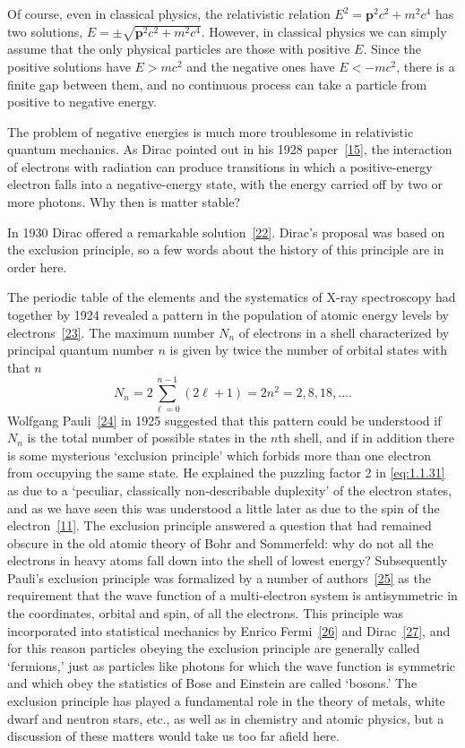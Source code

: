 Of course, even in classical physics, the relativistic relation
$E^2=\mathbf{p}^2c^2+m^2c^4$ has two solutions, $E=\pm\sqrt{\mathbf{p}^2c^2+m^2c^4}$. However,
in classical physics we can simply assume that the only physical particles
are those with positive $E$. Since the positive solutions have $E>mc^2$ and
the negative ones have $E<-mc^2$, there is a finite gap between them,
and no continuous process can take a particle from positive to negative
energy.

The problem of negative energies is much more troublesome in relativistic
quantum mechanics. As Dirac pointed out in his 1928 paper~\hyperref[ref:1.15]{[15]}, the
interaction of electrons with radiation can produce transitions in which a
positive-energy electron falls into a negative-energy state, with the energy
carried off by two or more photons. Why then is matter stable?

In 1930 Dirac offered a remarkable solution~\hyperref[ref:1.22]{[22]}. Dirac's proposal was
based on the exclusion principle, so a few words about the history of this
principle are in order here.

The periodic table of the elements and the systematics of X-ray spectroscopy
had together by 1924 revealed a pattern in the population of
atomic energy levels by electrons~\hyperref[ref:1.23]{[23]}. The maximum number $N_n$ of electrons
in a shell characterized by principal quantum number $n$ is given by twice
the number of orbital states with that $n$
\begin{equation}
  N_n=2\sum_{\ell=0}^{n-1}(2\ell+1)=2n^2=2,8,18,\ldots.
  \tag{1.1.31}\label{eq:1.1.31}
\end{equation}
Wolfgang Pauli~\hyperref[ref:1.24]{[24]} in 1925 suggested that this pattern could be understood if
$N_n$ is the total number of possible states in the $n$th shell, and if in addition
there is some mysterious `exclusion principle' which forbids more than one
electron from occupying the same state. He explained the puzzling factor
2 in \eqref{eq:1.1.31} as due to a `peculiar, classically non-describable duplexity' of
the electron states, and as we have seen this was understood a little later
as due to the spin of the electron~\hyperref[ref:1.11]{[11]}. The exclusion principle answered a
question that had remained obscure in the old atomic theory of Bohr and
Sommerfeld: why do not all the electrons in heavy atoms fall down into
the shell of lowest energy? Subsequently Pauli's exclusion principle was
formalized by a number of authors~\hyperref[ref:1.25]{[25]} as the requirement that the wave
function of a multi-electron system is antisymmetric in the coordinates,
orbital and spin, of all the electrons. This principle was incorporated into
statistical mechanics by Enrico Fermi~\hyperref[ref:1.26]{[26]} and Dirac~\hyperref[ref:1.27]{[27]}, and for this reason
particles obeying the exclusion principle are generally called `fermions,'
just as particles like photons for which the wave function is symmetric
and which obey the statistics of Bose and Einstein are called `bosons.' The
exclusion principle has played a fundamental role in the theory of metals,
white dwarf and neutron stars, etc., as well as in chemistry and atomic
physics, but a discussion of these matters would take us too far afield
here.

